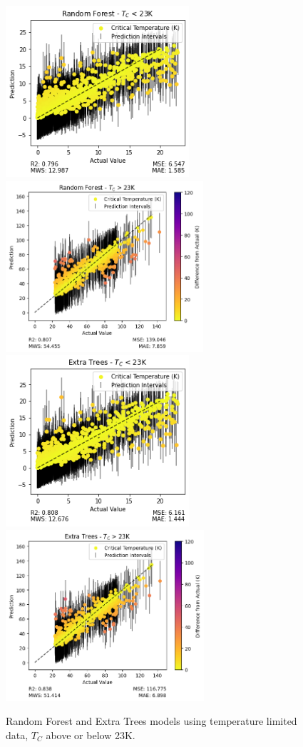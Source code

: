 \documentclass[twocolumn, nofootinbib, secnumarabic, amssymb, nobibnotes, aps, prd]{revtex4-2}
\begin{document}
\begin{figure}[]
   \centering
   \includegraphics[height=2.5in]{images/subfigures/random_forest_t_c_<_23k.png}%
   \includegraphics[height=2.5in]{images/subfigures/random_forest_t_c_>_23k.png}\\
   \includegraphics[height=2.5in]{images/subfigures/extra_trees_t_c_<_23k.png}
   \includegraphics[height=2.5in]{images/subfigures/extra_trees_t_c_>_23k.png}
   \caption{Random Forest and Extra Trees models using temperature limited data, $T_C$ above or below 23K.}
   \label{fig:temp-limited}
\end{figure}%
\end{document}

